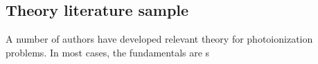 \subsection{Theory literature sample\label{sec:theory-lit}}

A number of authors have developed relevant theory for photoionization problems. In most cases, the fundamentals are s